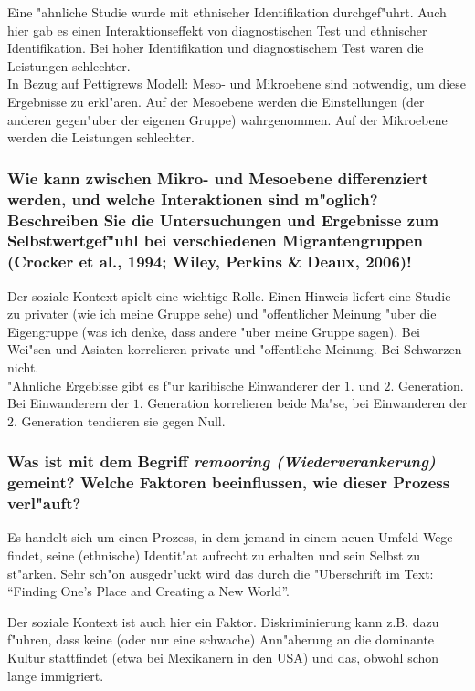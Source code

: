 Eine "ahnliche Studie wurde mit ethnischer Identifikation durchgef"uhrt. Auch hier gab es einen Interaktionseffekt von diagnostischen Test und ethnischer Identifikation. Bei hoher Identifikation und diagnostischem Test waren die Leistungen schlechter.\\

In Bezug auf Pettigrews Modell: Meso- und Mikroebene sind notwendig, um diese Ergebnisse zu erkl"aren. Auf der Mesoebene werden die Einstellungen (der anderen gegen"uber der eigenen Gruppe) wahrgenommen. Auf der Mikroebene werden die Leistungen schlechter.

\subsubsection{Wie kann zwischen Mikro- und Mesoebene differenziert werden, und welche Interaktionen sind m"oglich? Beschreiben Sie die Untersuchungen und Ergebnisse zum Selbstwertgef"uhl bei verschiedenen Migrantengruppen (Crocker et al., 1994; Wiley, Perkins \& Deaux, 2006)!}
Der soziale Kontext spielt eine wichtige Rolle. Einen Hinweis liefert eine Studie zu privater (wie ich meine Gruppe sehe) und "offentlicher Meinung "uber die Eigengruppe (was ich denke, dass andere "uber meine Gruppe sagen). Bei Wei"sen und Asiaten korrelieren private und "offentliche Meinung. Bei Schwarzen nicht.\\

"Ahnliche Ergebisse gibt es f"ur karibische Einwanderer der $1.$ und $2.$ Generation. Bei Einwanderern der $1.$ Generation korrelieren beide Ma"se, bei Einwanderen der $2.$ Generation tendieren sie gegen Null.

\subsubsection{Was ist mit dem Begriff \emph{remooring (Wiederverankerung)} gemeint? Welche Faktoren beeinflussen, wie dieser Prozess verl"auft?}
Es handelt sich um einen Prozess, in dem jemand in einem neuen Umfeld Wege findet, seine (ethnische) Identit"at aufrecht zu erhalten und sein Selbst zu st"arken. Sehr sch"on ausgedr"uckt wird das durch die "Uberschrift im Text: ``Finding One's Place and Creating a New World''.

Der soziale Kontext ist auch hier ein Faktor. Diskriminierung kann z.B. dazu f"uhren, dass keine (oder nur eine schwache) Ann"aherung an die dominante Kultur stattfindet (etwa bei Mexikanern in den USA) und das, obwohl schon lange immigriert.
